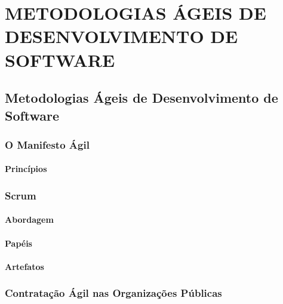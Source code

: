\part{METODOLOGIAS ÁGEIS DE DESENVOLVIMENTO DE SOFTWARE}

\chapter[Metodologias Ágeis de Desenvolvimento de Software]{Metodologias Ágeis de Desenvolvimento de Software}

\section[O Manifesto Ágil]{O Manifesto Ágil}

\subsection[Princípios]{Princípios}

\section[Scrum]{Scrum}

\subsection[Abordagem]{Abordagem}

\subsection[Papéis]{Papéis}

\subsection[Artefatos]{Artefatos}


\section[Contratação Ágil nas Organizações Públicas]{Contratação Ágil nas Organizações Públicas}
